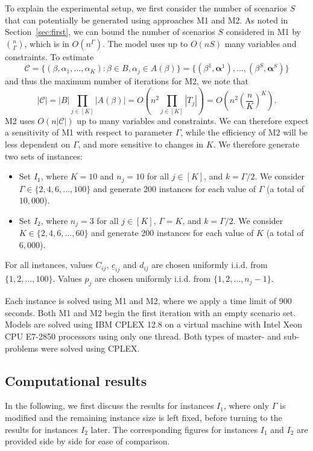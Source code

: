 To explain the experimental setup, we first consider the number of scenarios $S$ that can potentially be generated using approaches M1 and M2. As noted in Section~\ref{sec:first}, we can bound the number of scenarios $S$ considered in M1 by $\binom{n}{\Gamma}$, which is in $O(n^\Gamma)$. The model uses up to $O(nS)$ many variables and constraints. To estimate
\[ \mathcal{C} = \{ (\beta,\alpha_1,\ldots,\alpha_K) : \beta \in B, \alpha_j \in A(\beta) \} =  \{ (\beta^1,\pmb{\alpha}^1), \ldots, (\beta^S,\pmb{\alpha}^S) \} \]
and thus the maximum number of iterations for M2, we note that
\[ |\mathcal{C}| = |B| \prod_{j\in[K]} |A(\beta)| = O(n^2 \prod_{j\in[K]} |T_j|) = O(n^2\left(\frac{n}{K}\right)^K ). \]
M2 uses $O(n|\mathcal{C}|)$ up to many variables and constraints.
We can therefore expect a sensitivity of M1 with respect to parameter $\Gamma$, while the efficiency of M2 will be less dependent on $\Gamma$, and more sensitive to changes in $K$. We therefore generate two sets of instances:
\begin{itemize}
\item Set $I_1$, where $K=10$ and $n_j=10$ for all $j\in[K]$, and $k=\Gamma/2$. We consider $\Gamma\in \{2,4,6,\ldots,100\}$ and generate 200 instances for each value of $\Gamma$ (a total of $10,000$).

\item Set $I_2$, where $n_j=3$ for all $j\in[K]$, $\Gamma=K$, and $k=\Gamma/2$. We consider $K\in \{2,4,6,\ldots,60\}$ and generate 200 instances for each value of $K$ (a total of $6,000$).
\end{itemize}
For all instances, values $C_{ij}$, $\underline{c}_{ij}$ and $d_{ij}$ are chosen uniformly i.i.d.\! from $\{1,2,\ldots,100\}$. Values $p_j$ are chosen uniformly i.i.d.\! from $\{1,2,\ldots,n_j-1\}$.

Each instance is solved using M1 and M2, where we apply a time limit of 900 seconds. 
Both M1 and M2 begin the first iteration with an empty scenario set.
Models are solved using IBM CPLEX 12.8 on a virtual machine with Intel Xeon CPU E7-2850 processors using only one thread. Both types of master- and sub-problems were solved using CPLEX.

\subsection{Computational results}

In the following, we first discuss the results for instances $I_1$, where only $\Gamma$ is modified and the remaining instance size is left fixed, before turning to the results for instances $I_2$ later. The corresponding figures for instances $I_1$ and $I_2$ are provided side by side for ease of comparison.

